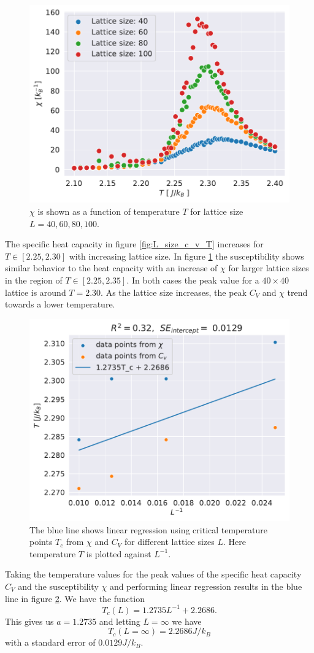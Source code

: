 \documentclass[english,notitlepage,reprint,nofootinbib]{revtex4-1}  %
\begin{document}
\begin{figure}[H]
    \centering
    \includegraphics[width=.5\textwidth]{../figures/L_size_X_T.pdf}
    \caption{$\chi$ is shown as a function of temperature $T$ for lattice size $L= 40, 60,80,100$.}
    \label{fig:L_size_X_T}
\end{figure}
The specific heat capacity in figure \ref{fig:L_size_c_v_T} increases for $T \in [2.25,2.30]$ with increasing lattice size. In figure \ref{fig:L_size_X_T} the susceptibility shows similar behavior to the heat capacity with an increase of $\chi$ for larger lattice sizes in the region of  $T \in [2.25,2.35]$. In both cases the peak value for a $40 \times 40$ lattice is around $T=2.30$. As the lattice size increases, the peak $C_V$ and $\chi$ trend towards a lower temperature. 

\begin{figure}[H]
    \centering
    \includegraphics[width=.5\textwidth]{../figures/linregress.pdf}
    \caption{The blue line shows linear regression using critical temperature points $T_c$ from $\chi$ and $C_V$ for different lattice sizes $L$. Here temperature $T$ is plotted against $L^{-1}$.}
    \label{fig:linregress}
\end{figure}
Taking the temperature values for the peak values of the specific heat capacity $C_V$ and the susceptibility $\chi$ and performing linear regression results in the blue line in figure \ref{fig:linregress}. We have the function 
\begin{equation}
    T_c(L) = 1.2735 L^{-1} + 2.2686.
\end{equation}
This gives us $a=1.2735$ and letting $L=\infty$ we have 
\begin{equation}
    T_c(L=\infty) = 2.2686 J/k_B
\end{equation}
with a standard error of $0.0129 J/k_B$.
\end{document}
